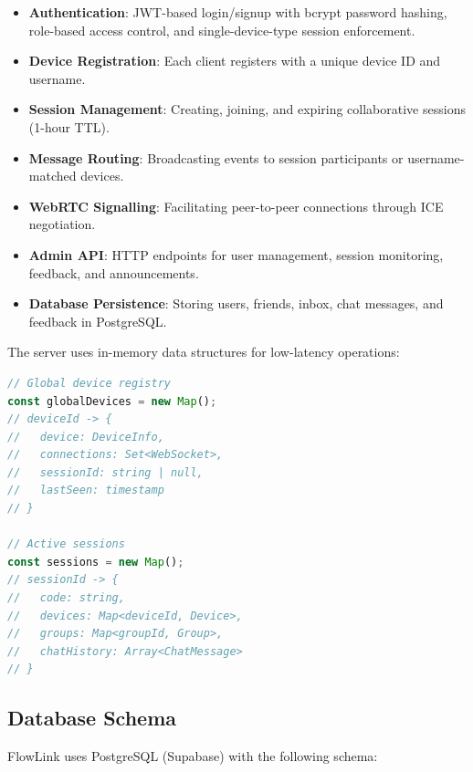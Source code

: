 \documentclass[conference]{IEEEtran}
\begin{document}
\begin{itemize}
    \item \textbf{Authentication}: JWT-based login/signup with bcrypt password hashing, role-based access control, and single-device-type session enforcement.
    \item \textbf{Device Registration}: Each client registers with a unique device ID and username.
    \item \textbf{Session Management}: Creating, joining, and expiring collaborative sessions (1-hour TTL).
    \item \textbf{Message Routing}: Broadcasting events to session participants or username-matched devices.
    \item \textbf{WebRTC Signalling}: Facilitating peer-to-peer connections through ICE negotiation.
    \item \textbf{Admin API}: HTTP endpoints for user management, session monitoring, feedback, and announcements.
    \item \textbf{Database Persistence}: Storing users, friends, inbox, chat messages, and feedback in PostgreSQL.
\end{itemize}

The server uses in-memory data structures for low-latency operations:

\begin{lstlisting}[language=JavaScript]
// Global device registry
const globalDevices = new Map();
// deviceId -> {
//   device: DeviceInfo,
//   connections: Set<WebSocket>,
//   sessionId: string | null,
//   lastSeen: timestamp
// }

// Active sessions
const sessions = new Map();
// sessionId -> {
//   code: string,
//   devices: Map<deviceId, Device>,
//   groups: Map<groupId, Group>,
//   chatHistory: Array<ChatMessage>
// }
\end{lstlisting}

\subsection{Database Schema}

FlowLink uses PostgreSQL (Supabase) with the following schema:
\end{document}
